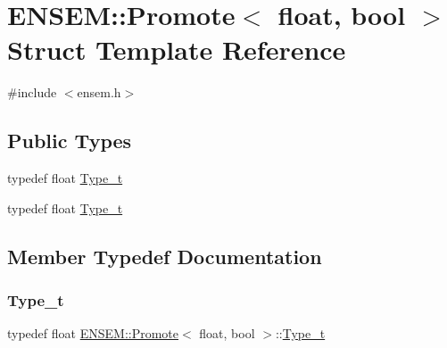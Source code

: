 \hypertarget{structENSEM_1_1Promote_3_01float_00_01bool_01_4}{}\section{E\+N\+S\+EM\+:\+:Promote$<$ float, bool $>$ Struct Template Reference}
\label{structENSEM_1_1Promote_3_01float_00_01bool_01_4}


{\ttfamily \#include $<$ensem.\+h$>$}

\subsection*{Public Types}
\begin{DoxyCompactItemize}
\item 
typedef float \mbox{\hyperlink{structENSEM_1_1Promote_3_01float_00_01bool_01_4_a6f3eae0e5a64ff95586a8924ebccb856}{Type\+\_\+t}}
\item 
typedef float \mbox{\hyperlink{structENSEM_1_1Promote_3_01float_00_01bool_01_4_a6f3eae0e5a64ff95586a8924ebccb856}{Type\+\_\+t}}
\end{DoxyCompactItemize}


\subsection{Member Typedef Documentation}
\mbox{\label{structENSEM_1_1Promote_3_01float_00_01bool_01_4_a6f3eae0e5a64ff95586a8924ebccb856}} 
\subsubsection{\texorpdfstring{Type\_t}{Type\_t}\hspace{0.1cm}{\footnotesize\ttfamily [1/2]}}
{\footnotesize\ttfamily typedef float \mbox{\hyperlink{structENSEM_1_1Promote}{E\+N\+S\+E\+M\+::\+Promote}}$<$ float, bool $>$\+::\mbox{\hyperlink{structENSEM_1_1Promote_3_01float_00_01bool_01_4_a6f3eae0e5a64ff95586a8924ebccb856}{Type\+\_\+t}}}

\mbox{\label{structENSEM_1_1Promote_3_01float_00_01bool_01_4_a6f3eae0e5a64ff95586a8924ebccb856}} 
